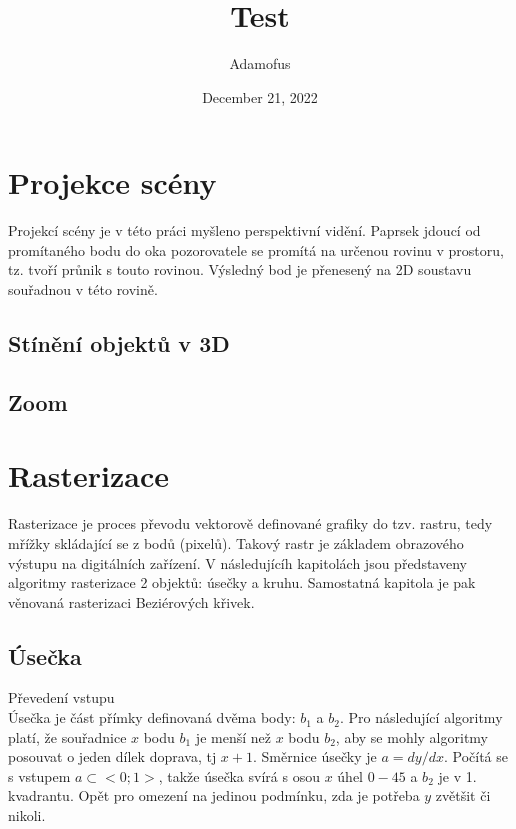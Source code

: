 \documentclass[a4paper,12pt]{book}
\begin{document}
\title{\Large{\textbf{Test}}}
\author{Adamofus}
\date{December 21, 2022}
\maketitle
\let\cleardoublepage\clearpage
\tableofcontents

	
\setcounter{page}{2}



\chapter{Projekce scény}
Projekcí scény je v této práci myšleno perspektivní vidění.
Paprsek jdoucí od promítaného bodu do oka pozorovatele se promítá na určenou rovinu v prostoru, tz. tvoří průnik s touto rovinou. Výsledný bod je přenesený na 2D soustavu souřadnou v této rovině.



\section{Stínění objektů v 3D}
\section{Zoom}




\chapter{Rasterizace}


Rasterizace je proces převodu vektorově definované grafiky do tzv. rastru, tedy mřížky skládající se z bodů (pixelů).
Takový rastr je základem obrazového výstupu na digitálních zařízení.
V následujícíh kapitolách jsou představeny algoritmy rasterizace 2 objektů: úsečky a kruhu.
Samostatná kapitola je pak věnovaná rasterizaci Beziérových křivek.


\section{Úsečka}



Převedení vstupu\\
Úsečka je část přímky definovaná dvěma body: $b_1$ a $b_2$.
Pro následující algoritmy platí, že souřadnice $x$ bodu $b_1$ je menší než $x$ bodu $b_2$, aby se mohly algoritmy posouvat o jeden dílek doprava, tj $x+1$.
Směrnice úsečky je $a = dy/dx$. 
Počítá se s vstupem $a\subset<0;1>$, takže úsečka svírá s osou $x$ úhel $0-45$ a $b_2$ je v 1. kvadrantu. Opět pro omezení na jedinou podmínku, zda je potřeba $y$ zvětšit či nikoli.
\end{document}
